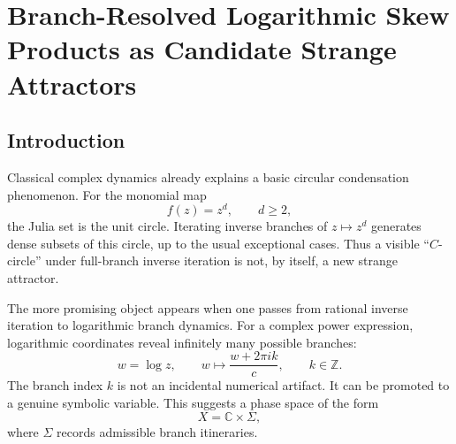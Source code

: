 \chapter{Branch-Resolved Logarithmic Skew Products as Candidate Strange Attractors}

\begingroup


\def\C{\mathbb{C}}

\def\Z{\mathbb{Z}}

\def\N{\mathbb{N}}

\def\D{\mathbb{D}}

\def\SigmaK{\Sigma_K}

\def\shift{\sigma}

\def\dist{\operatorname{dist}}

\def\diam{\operatorname{diam}}

\def\HTop{h_{\mathrm{top}}}

\def\dimH{\dim_{\mathrm H}}

\begin{abstract}
		This note proposes a candidate family of strange attractors arising from branch-resolved logarithmic inverse dynamics. The guiding idea is to separate the classical phenomenon of inverse iteration accumulating on Julia sets from a potentially less classical phenomenon: skew-product dynamics in which the logarithmic branch itinerary is itself part of the phase space. The resulting object is not merely a projected cloud in the complex plane, but an invariant set in a lifted complex-symbolic space. The purpose of the note is not to claim a new theorem, but to formulate a precise research candidate for later numerical, symbolic, and formal investigation.
	\end{abstract}
	
	\section{Introduction}
	
	Classical complex dynamics already explains a basic circular condensation phenomenon. For the monomial map
	\[
	f(z)=z^d,
	\qquad d\geq 2,
	\]
	the Julia set is the unit circle. Iterating inverse branches of \(z\mapsto z^d\) generates dense subsets of this circle, up to the usual exceptional cases. Thus a visible ``\(C\)-circle'' under full-branch inverse iteration is not, by itself, a new strange attractor.
	
	The more promising object appears when one passes from rational inverse iteration to logarithmic branch dynamics. For a complex power expression, logarithmic coordinates reveal infinitely many possible branches:
	\[
	w=\log z,
	\qquad
	w \mapsto \frac{w+2\pi i k}{c},
	\qquad k\in \Z.
	\]
	The branch index \(k\) is not an incidental numerical artifact. It can be promoted to a genuine symbolic variable. This suggests a phase space of the form
	\[
	X = \C \times \Sigma,
	\]
	where \(\Sigma\) records admissible branch itineraries.
	
